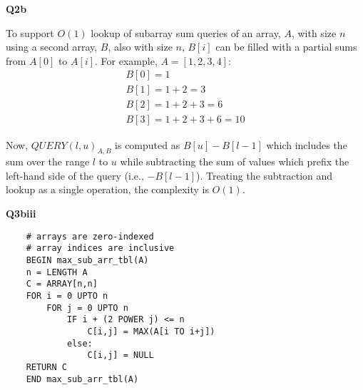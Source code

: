 \documentclass{article}
\begin{document}
\textbf{Q2b}

To support $O(1)$ lookup of subarray sum queries of an array, $A$, with size $n$ using a 
second array, $B$, also with size $n$, $B[i]$ can be filled with a partial sums from $A[0]$ to 
$A[i]$. For example, $A = [1,2,3,4]$:
\begin{align*}
    B[0] = 1 \\
    B[1] = 1 + 2 = 3 \\
    B[2] = 1 + 2 + 3 = 6 \\
    B[3] = 1 + 2 + 3 + 6 = 10
\end{align*}

Now, $QUERY(l,u)_{A,B}$ is computed as $B[u] - B[l-1]$ which includes the sum 
over the range $l$ to $u$ while subtracting the sum of values which prefix the 
left-hand side of the query (i.e., $-B[l-1]$). Treating the subtraction and 
lookup as a single operation, the complexity is $O(1)$.

\textbf{Q3biii}

\begin{verbatim}
    # arrays are zero-indexed
    # array indices are inclusive
    BEGIN max_sub_arr_tbl(A)
    n = LENGTH A
    C = ARRAY[n,n]
    FOR i = 0 UPTO n
        FOR j = 0 UPTO n
            IF i + (2 POWER j) <= n
                C[i,j] = MAX(A[i TO i+j])
            else:
                C[i,j] = NULL
    RETURN C
    END max_sub_arr_tbl(A)

\end{verbatim}




\end{document}
